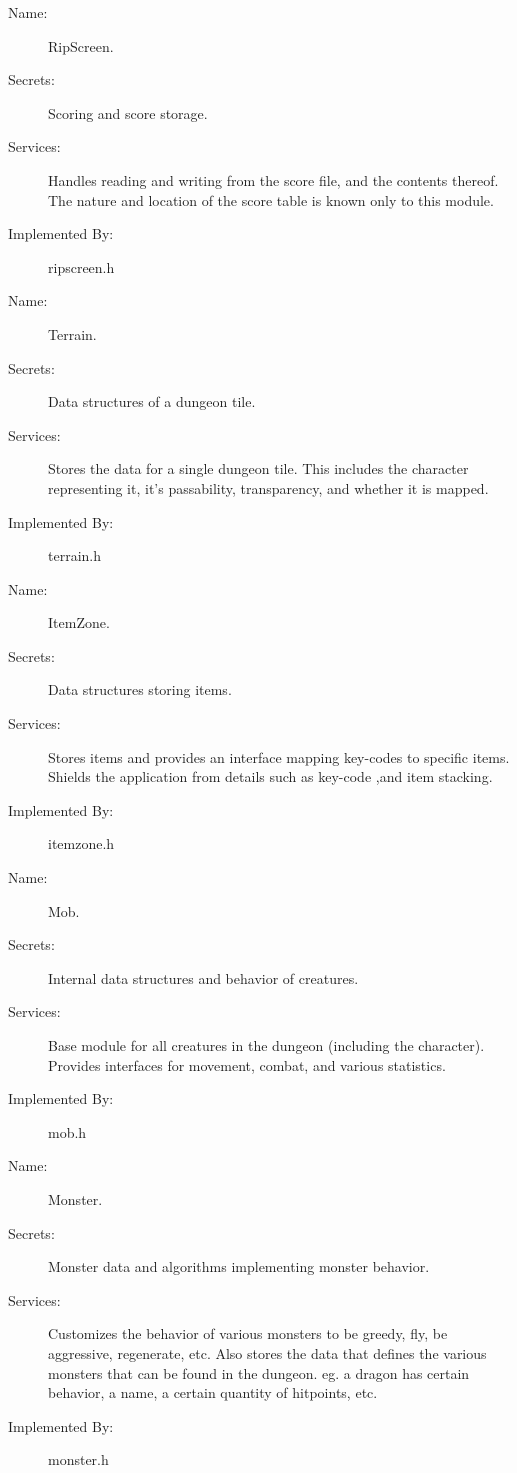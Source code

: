 \documentclass[12pt, titlepage]{article}
\begin{document}
		\bigskip\begin{description}
			\item[Name:]RipScreen.
			\item[Secrets:]Scoring and score storage.
			\item[Services:]Handles reading and writing from the score file, and the contents thereof. The nature and location of the score table is known only to this module.
			\item[Implemented By:]ripscreen.h
		\end{description}

		\bigskip\begin{description}
			\item[Name:]Terrain.
			\item[Secrets:]Data structures of a dungeon tile.
			\item[Services:]Stores the data for a single dungeon tile. This includes the character representing it, it's passability, transparency, and whether it is mapped.
			\item[Implemented By:]terrain.h
		\end{description}

		\bigskip\begin{description}
			\item[Name:]ItemZone.
			\item[Secrets:]Data structures storing items.
			\item[Services:]Stores items and provides an interface mapping key-codes to specific items. Shields the application from details such as key-code ,and item stacking. 
			\item[Implemented By:]itemzone.h
		\end{description}

		\bigskip\begin{description}
			\item[Name:]Mob.
			\item[Secrets:]Internal data structures and behavior of creatures.
			\item[Services:]Base module for all creatures in the dungeon (including the character). Provides interfaces for movement, combat, and various statistics.
			\item[Implemented By:]mob.h
		\end{description}

		\bigskip\begin{description}
			\item[Name:]Monster.
			\item[Secrets:]Monster data and algorithms implementing monster behavior.
			\item[Services:]Customizes the behavior of various monsters to be greedy, fly, be aggressive, regenerate, etc. Also stores the data that defines the various monsters that can be found in the dungeon. eg. a dragon has certain behavior, a name, a certain quantity of hitpoints, etc.
			\item[Implemented By:]monster.h
		\end{description}
\end{document}
